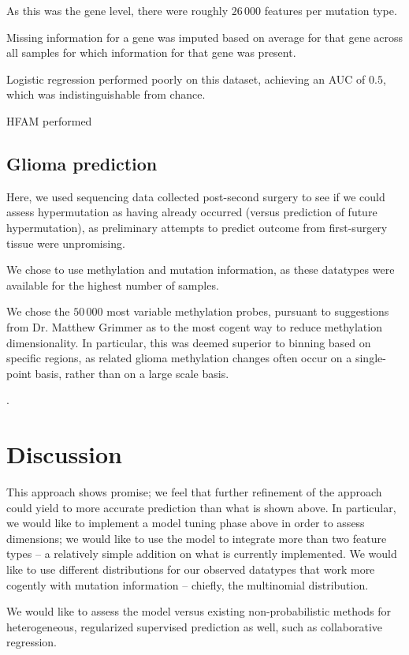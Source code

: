 As this was the gene level, there were roughly $26\,000$ features per mutation type.

Missing information for a gene was imputed based on average for that gene across all samples for which information for that gene was present. 

Logistic regression performed poorly on this dataset, achieving an AUC of $0.5$, which was indistinguishable from chance.

HFAM performed 



\subsection{Glioma prediction}

Here, we used sequencing data collected post-second surgery to see if we could assess hypermutation as having already occurred (versus prediction of future hypermutation), as preliminary attempts to predict outcome from first-surgery tissue were unpromising.

We chose to use methylation and mutation information, as these datatypes were available for the highest number of samples.

We chose the $50\,000$ most variable methylation probes, pursuant to suggestions from Dr. Matthew Grimmer as to the most cogent way to reduce methylation dimensionality. In particular, this was deemed superior to binning based on specific regions, as related glioma methylation changes often occur on a single-point basis, rather than on a large scale basis.

.


\section{Discussion}

This approach shows promise; we feel that further refinement of the approach could yield to more accurate prediction than what is shown above. In particular, we would like to implement a model tuning phase above in order to assess dimensions; we would like to use the model to integrate more than two feature types -- a relatively simple addition on what is currently implemented. We would like to use different distributions for our observed datatypes that work more cogently with mutation information -- chiefly, the multinomial distribution.

We would like to assess the model versus existing non-probabilistic methods for heterogeneous, regularized supervised prediction as well, such as collaborative regression. 
